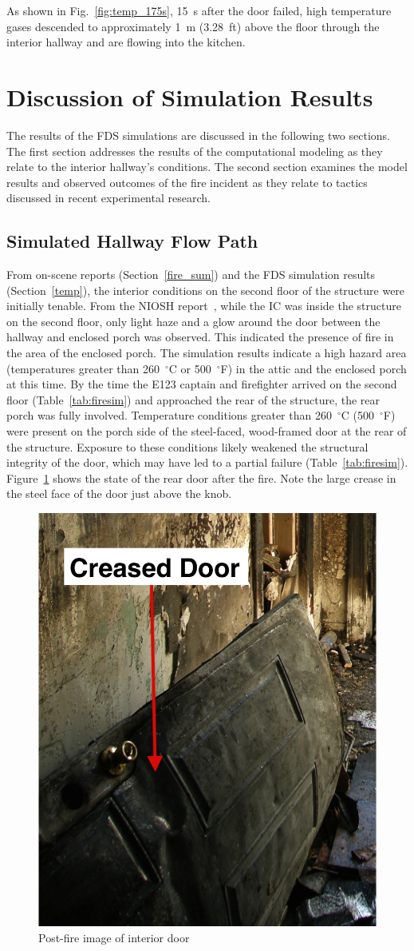 As shown in Fig.~\ref{fig:temp_175s}, 15~s after the door failed, high temperature gases descended to approximately 1~m (3.28~ft) above the floor through the interior hallway and are flowing into the kitchen.

\section{Discussion of Simulation Results}
\label{discussion}
The results of the FDS simulations are discussed in the following two sections. The first section addresses the results of the computational modeling as they relate to the interior hallway's conditions. The second section examines the model results and observed outcomes of the fire incident as they relate to tactics discussed in recent experimental research. 

\subsection{Simulated Hallway Flow Path}
\label{flowpath}
From on-scene reports (Section~\ref{fire_sum}) and the FDS simulation results (Section~\ref{temp}), the interior conditions on the second floor of the structure were initially tenable. From the NIOSH report~\cite{NIOSH:Bowyer}, while the IC was inside the structure on the second floor, only light haze and a glow around the door between the hallway and enclosed porch was observed. This indicated the presence of fire in the area of the enclosed porch. The simulation results indicate a high hazard area (temperatures greater than 260~$^{\circ}$C or 500~$^{\circ}$F) in the attic and the enclosed porch at this time. By the time the E123 captain and firefighter arrived on the second floor (Table~\ref{tab:firesim}) and approached the rear of the structure, the rear porch was fully involved. Temperature conditions greater than 260~$^{\circ}$C (500~$^{\circ}$F) were present on the porch side of the steel-faced, wood-framed door at the rear of the structure. Exposure to these conditions likely weakened the structural integrity of the door, which may have led to a partial failure (Table~\ref{tab:firesim}). Figure~\ref{fig:chicago_doorfold} shows the state of the rear door after the fire. Note the large crease in the steel face of the door just above the knob.

\begin{figure}[!ht]
\centering
\includegraphics[width=.4\textwidth]{../Figures/Porch_Door_1}
\caption{Post-fire image of interior door}
\label{fig:chicago_doorfold}
\end{figure}

